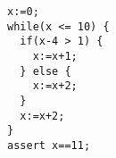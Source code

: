 \begin{lstlisting}[]  % Start your code-block
x:=0;
while(x <= 10) {
  if(x-4 > 1) {
    x:=x+1;
  } else {
    x:=x+2;
  }
  x:=x+2;
}
assert x==11;
\end{lstlisting}